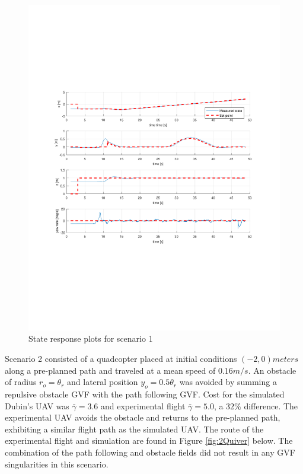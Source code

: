 \documentclass[numbered,pdftex]{ohio-etd}
\begin{document}
\begin{figure}[H]
	\centering
	\includegraphics[trim = 65 200 0 200, clip, width=17cm]{Figures/results/compareFigures/1Controller}
	\caption{State response plots for scenario 1}
	\label{fig:1Controller}
\end{figure}



Scenario 2 consisted of a quadcopter placed at initial conditions $(-2,0) meters$ along a pre-planned path and traveled at a mean speed of $0.16 m/s$. An obstacle of radius $r_o = \theta_r$ and lateral position $y_o=0.5 \theta_r$ was avoided by summing a repulsive obstacle GVF with the path following GVF. Cost for the simulated Dubin's UAV was $\bar{\gamma} = 3.6$ and experimental flight $\bar{\gamma} = 5.0$, a $32 \%$ difference. The experimental UAV avoids the obstacle and returns to the pre-planned path, exhibiting a similar flight path as the simulated UAV. The route of the experimental flight and simulation are found in Figure \ref{fig:2Quiver} below. The combination of the path following and obstacle fields did not result in any GVF singularities in this scenario. 
\end{document}
